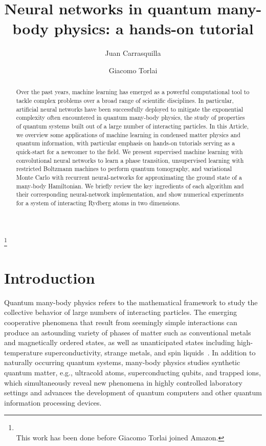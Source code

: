 \documentclass[twocolumn,english,reprint,superscriptaddress,longbibliography,pra]{revtex4-1}
\begin{document}
\title{Neural networks in quantum many-body physics: a hands-on tutorial}

\author{Juan Carrasquilla}
\author{Giacomo Torlai}
\thanks{\\This work has been done before Giacomo Torlai joined Amazon.}



\begin{abstract}
Over the past years, machine learning has emerged as a powerful computational tool to tackle complex problems over a broad range of scientific disciplines. In particular, artificial neural networks have been successfully deployed to mitigate the exponential complexity often encountered in quantum many-body physics, the study of properties of quantum systems built out of a large number of interacting particles. In this Article, we overview some applications of machine learning in condensed matter physics and quantum information, with particular emphasis on hands-on tutorials serving as a quick-start for a newcomer to the field. We present supervised machine learning with convolutional neural networks to learn a phase transition, unsupervised learning with restricted Boltzmann machines to perform quantum tomography, and variational Monte Carlo with recurrent neural-networks for approximating the ground state of a many-body Hamiltonian. We briefly review the key ingredients of each algorithm and their corresponding neural-network implementation, and show numerical experiments for a system of interacting Rydberg atoms in two dimensions.
\end{abstract}

\maketitle

\section{Introduction}

Quantum many-body physics refers to the mathematical framework to study the collective behavior of large numbers of interacting particles. The emerging cooperative phenomena that result from seemingly simple interactions can produce an astounding variety of phases of matter such as conventional metals and magnetically ordered states, as well as unanticipated states including high-temperature superconductivity, strange metals, and spin liquids~\cite{Xiao:803748}. In addition to naturally occurring quantum systems, many-body physics studies synthetic quantum matter, e.g., ultracold atoms, superconducting qubits, and trapped ions, which simultaneously reveal new phenomena in highly controlled laboratory settings and advances the development of quantum computers and other quantum information processing devices.
\end{document}

